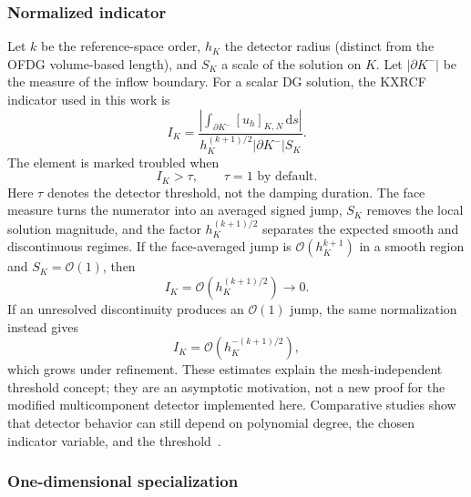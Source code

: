 \subsubsection{Normalized indicator}

Let $k$ be the reference-space order, $h_K$ the detector radius (distinct from
the OFDG volume-based length), and $S_K$ a scale of
the solution on $K$. Let $|\partial K^-|$ be the measure of the inflow boundary.
For a scalar DG solution, the KXRCF indicator used in this work is
\begin{equation}
 I_K=
 \frac{\left|\displaystyle\int_{\partial K^-}
        [u_h]_{K,N}\,\mathrm ds\right|}
      {h_K^{(k+1)/2}|\partial K^-|S_K}.
 \label{eq:kxrcf-indicator}
\end{equation}
The element is marked troubled when
\begin{equation}
  I_K>\tau,
  \qquad \tau=1 \text{ by default}.
  \label{eq:kxrcf-threshold}
\end{equation}
Here $\tau$ denotes the detector threshold, not the damping duration.
The face measure turns the numerator into an averaged signed jump, $S_K$
removes the local solution magnitude, and the factor $h_K^{(k+1)/2}$ separates
the expected smooth and discontinuous regimes.  If the face-averaged jump is
$\mathcal{O}(h_K^{k+1})$ in a smooth region and $S_K=\mathcal{O}(1)$, then
\begin{equation}
  I_K=\mathcal{O}\!\left(h_K^{(k+1)/2}\right)
  \longrightarrow 0.
  \label{eq:kxrcf-smooth-scaling}
\end{equation}
If an unresolved discontinuity produces an $\mathcal{O}(1)$ jump, the same
normalization instead gives
\begin{equation}
  I_K=\mathcal{O}\!\left(h_K^{-(k+1)/2}\right),
  \label{eq:kxrcf-shock-scaling}
\end{equation}
which grows under refinement.  These estimates explain the mesh-independent
threshold concept; they are an asymptotic motivation, not a new proof for the
modified multicomponent detector implemented here.  Comparative studies show
that detector behavior can still depend on polynomial degree, the chosen
indicator variable, and the threshold~\cite{QiuShu2005,FuShu2017,
VuikRyan2014,VuikRyan2016}.

\subsubsection{One-dimensional specialization}

